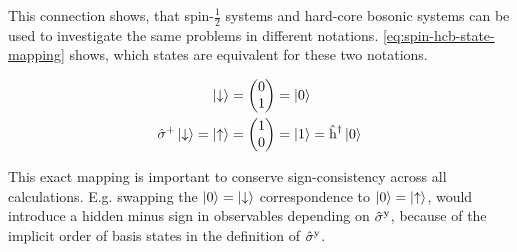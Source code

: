 This connection shows, that spin-$\frac{1}{2}$ systems and hard-core bosonic systems can be used to investigate the same problems in different notations.
\autoref{eq:spin-hcb-state-mapping} shows, which states are equivalent for these two notations.

\begin{equation}
    \label{eq:spin-hcb-state-mapping}
    \begin{split}
        \ketN[\down] &= \left(\begin{matrix}
            0 \\
            1
        \end{matrix}\right) = \ketN[0] \\
        \pauli[]{+}\ketN[\down] = \ketN[\up] &= \left(\begin{matrix}
            1 \\
            0
        \end{matrix}\right) = \ketN[1] = \hop{}{\dagger}\ketN[0] \\
    \end{split}
\end{equation}

This exact mapping is important to conserve sign-consistency across all calculations. 
E.g. swapping the $\ketN[0] = \ketN[\down]$ correspondence to $\ketN[0] = \ketN[\up]$, would introduce a hidden minus sign in observables depending on $\pauli[]{y}$, because of the implicit order of basis states in the definition of $\pauli[]{y}$.